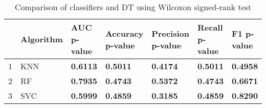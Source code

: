 \begin{table}
\footnotesize
\caption{Comparison of classifiers and DT using Wilcoxon signed-rank test}
\label{tab:wilcoxon comparison}
\begin{tabular}{lllllll}
\hline
 & Algorithm & AUC p-value & Accuracy p-value & Precision p-value & Recall p-value & F1 p-value \\
\hline
1 & KNN & \textbf{0.6113} & \textbf{0.5011} & \textbf{0.4174} & \textbf{0.5011} & \textbf{0.4958} \\
2 & RF & \textbf{0.7935} & \textbf{0.4743} & \textbf{0.5372} & \textbf{0.4743} & \textbf{0.6671} \\
3 & SVC & \textbf{0.5999} & \textbf{0.4859} & \textbf{0.3185} & \textbf{0.4859} & \textbf{0.8290} \\
\hline
\end{tabular}
\end{table}
